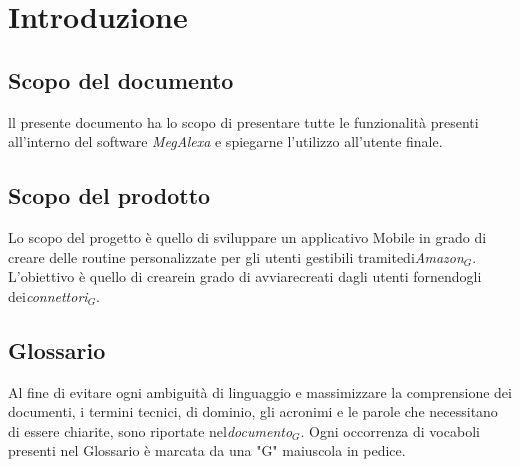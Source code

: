 \chapter{Introduzione}
\label{Introduzione}

\section{Scopo del documento}
ll presente documento ha lo scopo di presentare tutte le funzionalità presenti all'interno del software \textit{MegAlexa} e spiegarne l'utilizzo all'utente finale.

\section{Scopo del prodotto}
Lo scopo del progetto è  quello di sviluppare un applicativo Mobile in grado di creare delle routine personalizzate per gli utenti gestibili tramitedi\textit{Amazon$_{G}$}. L’obiettivo è quello di crearein grado di avviarecreati dagli utenti fornendogli dei\textit{connettori$_{G}$}.


\section{Glossario}
Al fine di evitare ogni ambiguità di linguaggio e massimizzare la comprensione dei documenti, i termini tecnici, di dominio, gli acronimi e le parole che necessitano di essere chiarite, sono riportate nel\textit{documento$_{G}$}.
Ogni occorrenza di vocaboli presenti nel Glossario è marcata da una "G" maiuscola in pedice.
